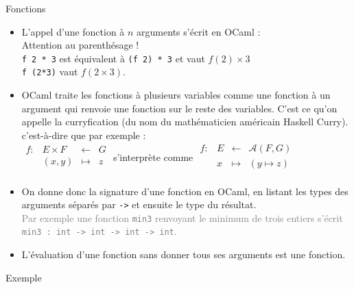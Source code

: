 \documentclass[10pt]{beamer}
\begin{document}
\begin{frame}{\Ctitle}{\stitle}
	\begin{block}{Fonctions}
		\begin{itemize}
			\item <1-> L'appel d'une fonction  à $n$ arguments s'écrit en OCaml :   \\
			      \textcolor{BrickRed}{\danger \;} Attention au parenthésage ! \\
			      {\tt f 2 * 3} est équivalent à {\tt (f 2) * 3} et vaut $f(2) \times 3$ \\
			      {\tt f (2*3)} vaut $f(2\times3)$.
			\item<2-> OCaml traite les fonctions à plusieurs variables comme une fonction à un argument qui renvoie une fonction sur le reste des variables. C'est ce qu'on appelle la \textcolor{BrickRed}{curryfication} (du nom du mathématicien américain Haskell Curry). c'est-à-dire que par exemple : \\
				$\begin{array}{llll}
						f : & E \times F & \leftarrow & G \\
						    & (x,y)      & \mapsto    & z \\
					\end{array}$ s'interprète comme
				$\begin{array}{llll}
						f : & E & \leftarrow & \mathcal{A}{(F,G)} \\
						    & x & \mapsto    & (y \mapsto z)      \\
					\end{array}$
			\item<3-> On donne donc la signature d'une fonction en OCaml, en listant les types des arguments séparés par {\tt ->} et ensuite le type du résultat.\\
			\onslide<4->\textcolor{gray}{Par exemple une fonction {\tt min3} renvoyant le minimum de trois entiers s'écrit {\tt min3 : int -> int -> int -> int}.}
			\item<5-> L'évaluation d'une fonction sans donner tous ses arguments est une fonction.

		\end{itemize}
	\end{block}
\end{frame}

\begin{frame}{\Ctitle}{\stitle}
	\begin{exampleblock}{Exemple}
	\end{exampleblock}
\end{frame}
\end{document}
